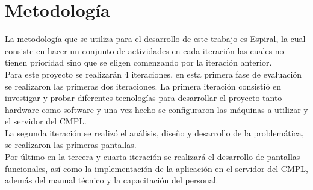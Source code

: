 \section{Metodología}

La metodología que se utiliza para el desarrollo de este trabajo es Espiral, la cual consiste en hacer un conjunto de actividades en cada iteración las cuales no tienen prioridad sino que se eligen comenzando por la iteración anterior.\\

Para este proyecto se realizarán 4 iteraciones, en esta primera fase de evaluación se realizaron las primeras dos iteraciones. La primera iteración consistió en investigar y probar  diferentes tecnologías para desarrollar el proyecto tanto hardware como software y una vez hecho se configuraron las máquinas a utilizar y el servidor del CMPL. \\
La segunda iteración se realizó el análisis, diseño y desarrollo de la problemática, se realizaron las primeras pantallas.\\

Por último en la tercera y cuarta iteración se realizará el desarrollo de pantallas funcionales, así como la implementación de la aplicación en el servidor del CMPL, además del manual técnico y la capacitación del personal. \\ 

